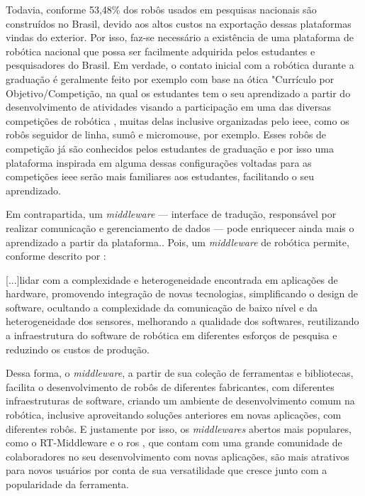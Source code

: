 Todavia, conforme  53,48\% dos robôs usados em pesquisas nacionais são construídos no Brasil, devido aos altos custos na exportação dessas plataformas vindas do exterior. Por isso, faz-se necessário a existência de uma plataforma de robótica nacional que possa ser facilmente adquirida pelos estudantes e pesquisadores do Brasil. Em verdade, o contato inicial com a robótica durante a graduação é geralmente feito por exemplo com base na ótica "Currículo por Objetivo/Competição, na qual os estudantes tem o seu aprendizado a partir do desenvolvimento de atividades visando a participação em uma das diversas competições de robótica \cite{Campos2017}, muitas delas inclusive organizadas pelo \gls*{ieee}, como os robôs seguidor de linha, sumô e micromouse, por exemplo. Esses robôs de competição já são conhecidos pelos estudantes de graduação e por isso uma plataforma inspirada em alguma dessas configurações voltadas para as competições \acrshort*{ieee} serão mais familiares aos estudantes, facilitando o seu aprendizado. 

Em contrapartida, um \textit{middleware} — interface de tradução, responsável por realizar comunicação e gerenciamento de dados — pode enriquecer ainda mais o aprendizado a partir da plataforma.. Pois, um \textit{middleware} de robótica permite, conforme descrito por :

\begin{quoting}[rightmargin=0cm,leftmargin=4cm]
	\begin{singlespace}
		{\footnotesize
			[...]lidar com a complexidade e heterogeneidade encontrada em aplicações de hardware, promovendo integração de novas tecnologias, simplificando o design de software, ocultando a complexidade da comunicação de baixo nível e da heterogeneidade dos sensores, melhorando a qualidade dos softwares, reutilizando a infraestrutura do software de robótica em diferentes esforços de pesquisa e reduzindo os custos de produção.
		}
	\end{singlespace}
\end{quoting}

Dessa forma, o \textit{middleware}, a partir de sua coleção de ferramentas e bibliotecas, facilita o desenvolvimento de robôs de diferentes fabricantes, com diferentes infraestruturas de software, criando um ambiente de desenvolvimento comum na robótica, inclusive aproveitando soluções anteriores em novas aplicações, com diferentes robôs. E justamente por isso, os \textit{middlewares} abertos mais populares, como o RT-Middleware e o \gls*{ros} \cite{Elkady2012}, que contam com uma grande comunidade de colaboradores no seu desenvolvimento com novas aplicações, são mais atrativos para novos usuários por conta de sua versatilidade que cresce junto com a popularidade da ferramenta.

